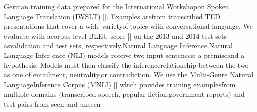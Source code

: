 German training data prepared for the International Workshopon  Spoken  Language  Translation  (IWSLT)  [].  Examples  arefrom transcribed TED presentations that cover a wide varietyof  topics  with  conversational  language.  We  evaluate  with  acorpus-level BLEU score [] on the 2013 and 2014 test sets asvalidation and test sets, respectively.Natural  Language  Inference.Natural  Language  Infer-ence  (NLI)  models  receive  two  input  sentences:  a  premiseand  a  hypothesis.  Models  must  then  classify  the  inferencerelationship between the two as one of entailment, neutrality,or  contradiction.  We  use  the  Multi-Genre  Natural  LanguageInference Corpus (MNLI) [] which provides training examplesfrom  multiple  domains  (transcribed  speech,  popular  fiction,government  reports)  and  test  pairs  from  seen  and  unseen

